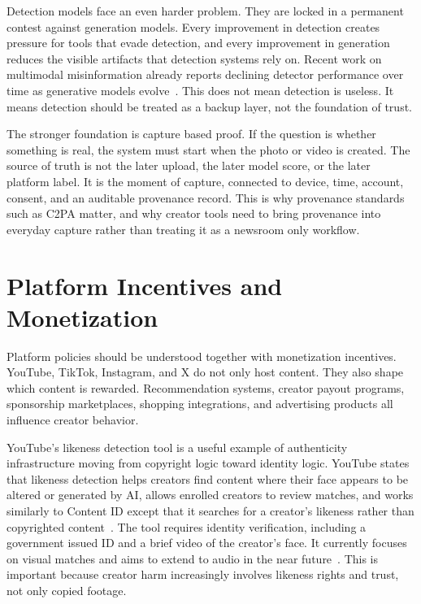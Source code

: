 \documentclass[11pt]{article}
\begin{document}
Detection models face an even harder problem. They are locked in a permanent contest against generation models. Every improvement in detection creates pressure for tools that evade detection, and every improvement in generation reduces the visible artifacts that detection systems rely on. Recent work on multimodal misinformation already reports declining detector performance over time as generative models evolve~\cite{chrysidis2026synthetic}. This does not mean detection is useless. It means detection should be treated as a backup layer, not the foundation of trust.

The stronger foundation is capture based proof. If the question is whether something is real, the system must start when the photo or video is created. The source of truth is not the later upload, the later model score, or the later platform label. It is the moment of capture, connected to device, time, account, consent, and an auditable provenance record. This is why provenance standards such as C2PA matter, and why creator tools need to bring provenance into everyday capture rather than treating it as a newsroom only workflow.

\section{Platform Incentives and Monetization}

Platform policies should be understood together with monetization incentives. YouTube, TikTok, Instagram, and X do not only host content. They also shape which content is rewarded. Recommendation systems, creator payout programs, sponsorship marketplaces, shopping integrations, and advertising products all influence creator behavior.

YouTube's likeness detection tool is a useful example of authenticity infrastructure moving from copyright logic toward identity logic. YouTube states that likeness detection helps creators find content where their face appears to be altered or generated by AI, allows enrolled creators to review matches, and works similarly to Content ID except that it searches for a creator's likeness rather than copyrighted content~\cite{youtubeLikeness2026}. The tool requires identity verification, including a government issued ID and a brief video of the creator's face. It currently focuses on visual matches and aims to extend to audio in the near future~\cite{youtubeLikeness2026}. This is important because creator harm increasingly involves likeness rights and trust, not only copied footage.
\end{document}
